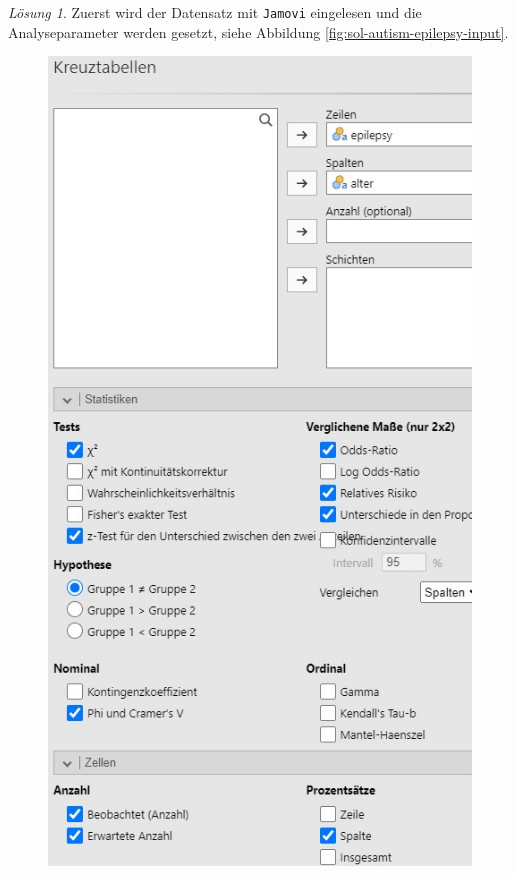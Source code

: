 \documentclass[
]{book}
\theoremstyle{definition}
\theoremstyle{definition}
\theoremstyle{definition}
\theoremstyle{definition}
\theoremstyle{remark}
\newtheorem*{solution}{Lösung}
\begin{document}
\begin{solution}

Zuerst wird der Datensatz mit \texttt{Jamovi} eingelesen und die
Analyseparameter werden gesetzt, siehe Abbildung
\ref{fig:sol-autism-epilepsy-input}.

\begin{figure}

{\centering \includegraphics[width=1\linewidth]{figures/09-exr-autism-epilepsy-jmv-input} 

}
\end{figure}
\end{solution}
\end{document}
